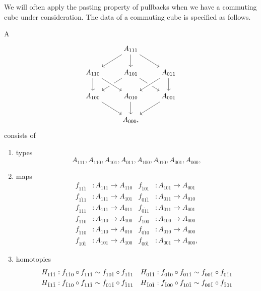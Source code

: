 We will often apply the pasting property of pullbacks when we have a commuting cube under consideration. The data of a commuting cube is specified as follows.

\begin{defn}\label{defn:cube}
A \label{defn:cube}
\begin{equation*}
\begin{tikzcd}
& A_{111} \arrow[dl] \arrow[dr] \arrow[d] \\
A_{110} \arrow[d] & A_{101} \arrow[dl] \arrow[dr] & A_{011} \arrow[dl,crossing over] \arrow[d] \\
A_{100} \arrow[dr] & A_{010} \arrow[d] \arrow[from=ul,crossing over] & A_{001} \arrow[dl] \\
& A_{000},
\end{tikzcd}
\end{equation*}
consists of 
\begin{enumerate}
\item types
\begin{equation*}
A_{111},A_{110},A_{101},A_{011},A_{100},A_{010},A_{001},A_{000},
\end{equation*}
\item \begin{samepage}%
maps
\begin{align*}
f_{11\check{1}} & : A_{111}\to A_{110} & f_{\check{1}01} & : A_{101}\to A_{001} \\
f_{1\check{1}1} & : A_{111}\to A_{101} & f_{01\check{1}} & : A_{011}\to A_{010} \\
f_{\check{1}11} & : A_{111}\to A_{011} & f_{0\check{1}1} & : A_{011}\to A_{001} \\
f_{1\check{1}0} & : A_{110}\to A_{100} & f_{\check{1}00} & : A_{100}\to A_{000} \\
f_{\check{1}10} & : A_{110}\to A_{010} & f_{0\check{1}0} & : A_{010}\to A_{000} \\
f_{10\check{1}} & : A_{101}\to A_{100} & f_{00\check{1}} & : A_{001}\to A_{000},
\end{align*}
\end{samepage}%
\item homotopies
\begin{align*}
H_{1\check{1}\check{1}} & : f_{1\check{1}0}\circ f_{11\check{1}} \htpy f_{10\check{1}}\circ f_{1\check{1}1} & H_{0\check{1}\check{1}} & : f_{0\check{1}0}\circ f_{01\check{1}} \htpy f_{00\check{1}}\circ f_{0\check{1}1} \\
H_{\check{1}1\check{1}} & : f_{\check{1}10}\circ f_{11\check{1}} \htpy f_{01\check{1}}\circ f_{\check{1}11} & H_{\check{1}0\check{1}} & : f_{\check{1}00}\circ f_{10\check{1}} \htpy f_{00\check{1}}\circ f_{\check{1}01} \\

\end{align*}
\end{enumerate}
\end{defn}
